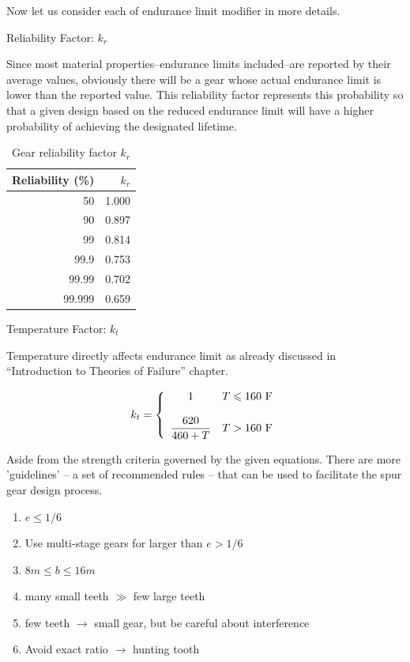 \documentclass[a4paper,openany]{tufte-book}
\begin{document}
Now let us consider each of endurance limit modifier in more details.

Reliability Factor: \(k_{r}\)

Since most material properties--endurance limits included--are reported by their average values, obviously there will be a gear whose actual endurance limit is lower than the reported value. This reliability factor represents this probability so that a given design based on the reduced endurance limit will have a higher probability of achieving the designated lifetime.

\begin{table}[htbp]
\caption{\label{tab: gear reliability factor}Gear reliability factor \(k_r\)}
\centering
\begin{tabular}{rr}
\toprule
Reliability (\%) & \(k_{r}\)\\
\midrule
50 & 1.000\\
90 & 0.897\\
99 & 0.814\\
99.9 & 0.753\\
99.99 & 0.702\\
99.999 & 0.659\\
\bottomrule
\end{tabular}
\end{table}

Temperature Factor: \(k_{t}\)

Temperature directly affects endurance limit as already discussed in ``Introduction to Theories of Failure'' chapter.

\begin{align}
  k_{t} = \left\{
  \begin{array}{cl}
    1 & T \leqslant 160 \text{ F} \\
    \hspace{5mm} \\
    \dfrac{620}{460 + T} & T > 160 \text{ F}
  \end{array}
  \right.
\end{align}

Aside from the strength criteria governed by the given equations. There are more 'guidelines' -- a set of recommended rules -- that can be used to facilitate the spur gear design process.

\begin{enumerate}
\item \(e \leqslant 1/6\)

\item Use multi-stage gears for larger than \(e > 1/6\)

\item \(8m \leqslant b \leq 16m\)

\item many small teeth \(\gg\) few large teeth

\item few teeth \(\rightarrow\) small gear, but be careful about
interference

\item Avoid exact ratio \(\rightarrow\) hunting tooth
\end{enumerate}
\end{document}
